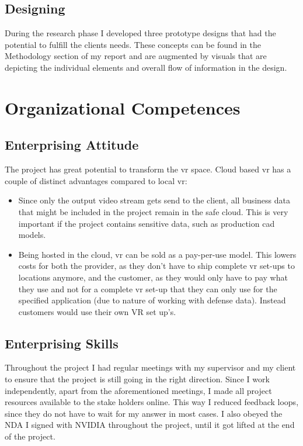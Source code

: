 \documentclass[]{article}
\begin{document}
\subsection{Designing}
During the research phase I developed three prototype designs that had the potential to fulfill the clients needs. These concepts can be found in the Methodology section of my report and are augmented by visuals that are depicting the individual elements and overall flow of information in the design.

\section{Organizational Competences}
\subsection{Enterprising Attitude}
The project has great potential to transform the \acrshort{vr} space. Cloud based \acrshort{vr} has a couple of distinct advantages compared to local \acrshort{vr}:
\begin{itemize}
  \item Since only the output video stream gets send to the client, all business data that might be included in the project remain in the safe cloud. This is very important if the project contains sensitive data, such as production \acrshort{cad} models.
  \item Being hosted in the cloud, \acrshort{vr} can be sold as a pay-per-use model. This lowers costs for both the provider, as they don't have to ship complete \acrshort{vr} set-ups to locations anymore, and the customer, as they would only have to pay what they use and not for a complete \acrshort{vr} set-up that they can only use for the specified application (due to nature of working with defense data). Instead customers would use their own VR set up's.
\end{itemize}

\subsection{Enterprising Skills}
Throughout the project I had regular meetings with my supervisor and my client to ensure that the project is still going in the right direction. Since I work independently, apart from the aforementioned meetings, I made all project resources available to the stake holders online. This way I reduced feedback loops, since they do not have to wait for my answer in most cases. I also obeyed the NDA I signed with NVIDIA throughout the project, until it got lifted at the end of the project.
\end{document}
